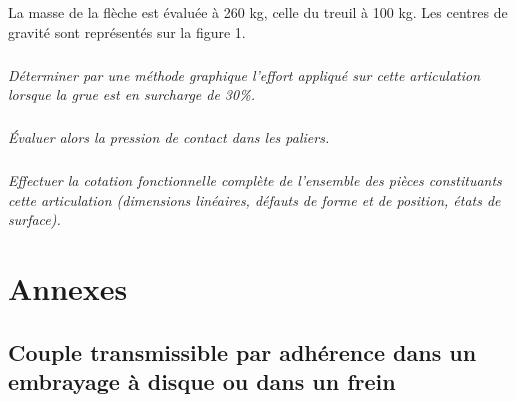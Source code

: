 \documentclass[10pt]{article}
\begin{document}
La masse de la flèche est évaluée à 260 kg, celle du treuil à 100 kg. Les centres de gravité sont représentés sur la figure 1. 

\subparagraph{}
\textit{Déterminer par une méthode graphique l'effort appliqué sur cette articulation lorsque la grue est en surcharge de 30\%.}

\subparagraph{}
\textit{Évaluer alors la pression de contact dans les paliers. }

\subparagraph{}
\textit{Effectuer la cotation fonctionnelle complète de l'ensemble des pièces constituants cette articulation (dimensions linéaires, défauts de forme et de position, états de surface).}


\section*{Annexes}

\subsection*{Couple transmissible par adhérence dans un embrayage à disque ou dans un frein}
\end{document}
